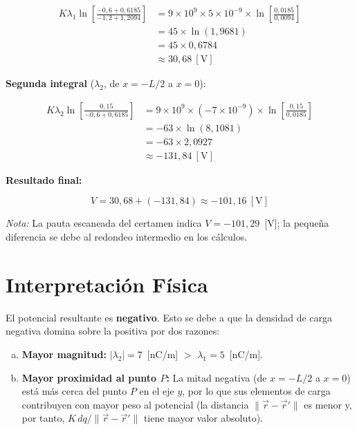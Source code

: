 \documentclass[12pt,letterpaper]{article}
\begin{document}
\begin{align*}
    K\lambda_1\ln\!\left[\frac{-0{,}6+0{,}6185}{-1{,}2+1{,}2094}\right]
        &= 9\times10^{9} \times 5\times10^{-9}
           \times \ln\!\left[\frac{0{,}0185}{0{,}0094}\right] \\[6pt]
        &= 45 \times \ln(1{,}9681) \\[6pt]
        &= 45 \times 0{,}6784 \\[6pt]
        &\approx 30{,}68\ [\text{V}]
\end{align*}

\bigskip
\noindent\textbf{Segunda integral} ($\lambda_2$, de $x=-L/2$ a $x=0$):

\begin{align*}
    K\lambda_2\ln\!\left[\frac{0{,}15}{-0{,}6+0{,}6185}\right]
        &= 9\times10^{9} \times (-7\times10^{-9})
           \times \ln\!\left[\frac{0{,}15}{0{,}0185}\right] \\[6pt]
        &= -63 \times \ln(8{,}1081) \\[6pt]
        &= -63 \times 2{,}0927 \\[6pt]
        &\approx -131{,}84\ [\text{V}]
\end{align*}

\bigskip
\noindent\textbf{Resultado final:}

\[
    \boxed{V = 30{,}68 + (-131{,}84) \approx -101{,}16\ [\text{V}]}
\]

\textit{Nota:} La pauta escaneada del certamen indica $V = -101{,}29$~[V];
la peque\~na diferencia se debe al redondeo intermedio en los c\'alculos.

\section*{Interpretaci\'on F\'isica}

El potencial resultante es \textbf{negativo}. Esto se debe a que la densidad de carga
negativa domina sobre la positiva por dos razones:

\begin{enumerate}[(a)]
    \item \textbf{Mayor magnitud:} $|\lambda_2| = 7$~[nC/m] $>$ $\lambda_1 = 5$~[nC/m].
    \item \textbf{Mayor proximidad al punto $P$:} La mitad negativa (de $x=-L/2$ a $x=0$)
          est\'a m\'as cerca del punto $P$ en el eje $y$, por lo que sus elementos
          de carga contribuyen con mayor peso al potencial (la distancia
          $\|\vec{r}-\vec{r}'\|$ es menor y, por tanto, $K\,dq/\|\vec{r}-\vec{r}'\|$
          tiene mayor valor absoluto).
\end{enumerate}
\end{document}
